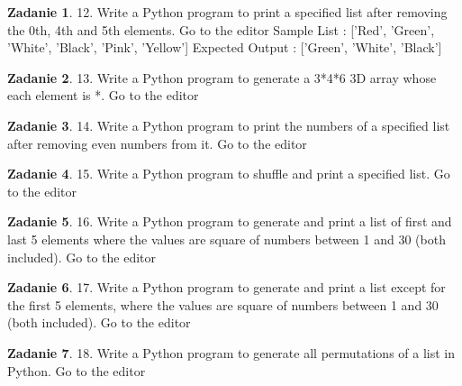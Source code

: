 \documentclass[11pt]{article}
\theoremstyle{definition}
\newtheorem{zadanie}{Zadanie}
\begin{document}
\begin{zadanie}


12. Write a Python program to print a specified list after removing the 0th, 4th and 5th elements. Go to the editor
Sample List : ['Red', 'Green', 'White', 'Black', 'Pink', 'Yellow']
Expected Output : ['Green', 'White', 'Black']


\end{zadanie}

\begin{zadanie}


13. Write a Python program to generate a 3*4*6 3D array whose each element is *. Go to the editor


\end{zadanie}

\begin{zadanie}


14. Write a Python program to print the numbers of a specified list after removing even numbers from it. Go to the editor


\end{zadanie}

\begin{zadanie}


15. Write a Python program to shuffle and print a specified list. Go to the editor


\end{zadanie}

\begin{zadanie}


16. Write a Python program to generate and print a list of first and last 5 elements where the values are square of numbers between 1 and 30 (both included). Go to the editor


\end{zadanie}

\begin{zadanie}


17. Write a Python program to generate and print a list except for the first 5 elements, where the values are square of numbers between 1 and 30 (both included). Go to the editor


\end{zadanie}

\begin{zadanie}


18. Write a Python program to generate all permutations of a list in Python. Go to the editor


\end{zadanie}
\end{document}
